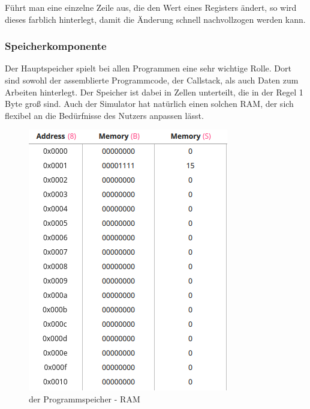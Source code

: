 Führt man eine einzelne Zeile aus, die den Wert eines Registers ändert, so wird dieses farblich hinterlegt, damit die Änderung schnell nachvollzogen werden kann.


\subsubsection{Speicherkomponente}
Der Hauptspeicher spielt bei allen Programmen eine sehr wichtige Rolle.
Dort sind sowohl der assemblierte Programmcode, der Callstack, als auch Daten zum Arbeiten hinterlegt.
Der Speicher ist dabei in Zellen unterteilt, die in der Regel 1 Byte groß sind.
Auch der Simulator hat natürlich einen solchen RAM, der sich flexibel an die Bedürfnisse des Nutzers anpassen lässt.

\begin{figure}[ht]
	\centering
  \includegraphics[scale=1]{Images/Memory}
	\caption{der Programmspeicher - RAM}
	\label{Memory}
\end{figure}

